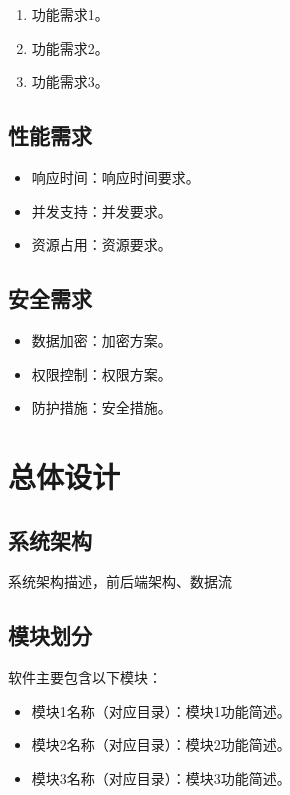 \documentclass[a4paper,12pt]{article}
\begin{document}
\begin{enumerate}[leftmargin=2em]
  \item {{功能需求1}}。
  \item {{功能需求2}}。
  \item {{功能需求3}}。
\end{enumerate}

\subsection{性能需求}

\begin{itemize}[leftmargin=2em]
  \item 响应时间：{{响应时间要求}}。
  \item 并发支持：{{并发要求}}。
  \item 资源占用：{{资源要求}}。
\end{itemize}

\subsection{安全需求}

\begin{itemize}[leftmargin=2em]
  \item 数据加密：{{加密方案}}。
  \item 权限控制：{{权限方案}}。
  \item 防护措施：{{安全措施}}。
\end{itemize}


\section{总体设计}

\subsection{系统架构}

{{系统架构描述，前后端架构、数据流}}

\subsection{模块划分}

软件主要包含以下模块：

\begin{itemize}[leftmargin=2em]
  \item {{模块1名称}}（{{对应目录}}）：{{模块1功能简述}}。
  \item {{模块2名称}}（{{对应目录}}）：{{模块2功能简述}}。
  \item {{模块3名称}}（{{对应目录}}）：{{模块3功能简述}}。
\end{itemize}
\end{document}

